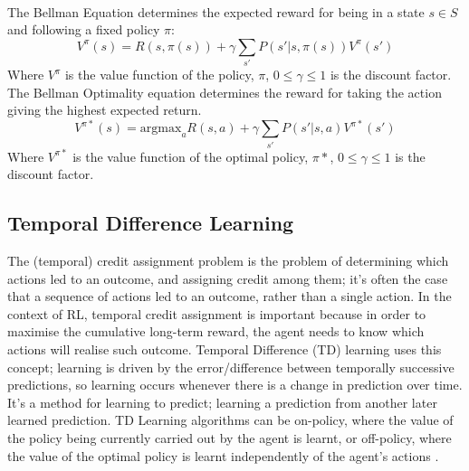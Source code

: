 \\The Bellman Equation determines the expected reward for being in a state $s \in S$ and following a fixed policy $\pi$:
$$V^\pi(s) = R(s, \pi(s)) + \gamma \sum_{s'}P(s'|s,\pi(s))V^\pi(s')$$
Where $V^\pi$ is the value function of the policy, $\pi$, $0 \le \gamma \le 1$ is the discount factor.
The Bellman Optimality equation determines the reward for taking the action giving the highest expected return.
$$V^{\pi*}(s) = \text{argmax}_a{R(s,a) + \gamma\sum_{s'}P(s'|s,a)V^{\pi*}(s')}$$
Where $V^{\pi*}$ is the value function of the optimal policy, $\pi*$, $0 \le \gamma \le 1$ is the discount factor.
\subsection{Temporal Difference Learning}
The (temporal) credit assignment problem \cite{Minsky:1961:ire} is the problem of determining which actions led to an outcome, and assigning credit among them; it's often the case that a sequence of actions led to an outcome, rather than a single action. In the context of RL, temporal credit assignment is important because in order to maximise the cumulative long-term reward, the agent needs to know which actions will realise such outcome. Temporal Difference (TD) \cite{10.5555/911176, 5392560} learning uses this concept; learning is driven by the error/difference between temporally successive predictions, so learning occurs whenever there is a change in prediction over time. It's a method for learning to predict; learning a prediction from another later learned prediction.
TD Learning algorithms can be on-policy, where the value of the policy being currently carried out by the agent is learnt, or off-policy, where the value of the optimal policy is learnt independently of the agent's actions \cite{PooleMackworth17}.
